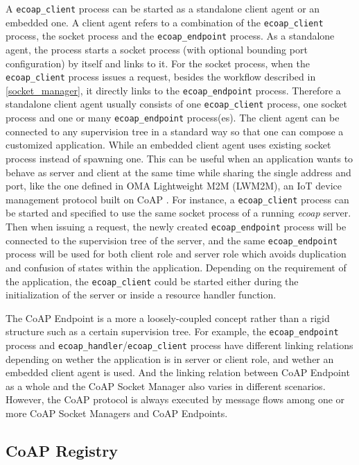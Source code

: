 \begin{itemize}
A \verb|ecoap_client| process can be started as a standalone client agent or an embedded one. A client agent refers to a combination of the \verb|ecoap_client| process, the socket process and the \verb|ecoap_endpoint| process. As a standalone agent, the process starts a socket process (with optional bounding port configuration) by itself and links to it. For the socket process, when the \verb|ecoap_client| process issues a request, besides the workflow described in \ref{socket_manager}, it directly links to the \verb|ecoap_endpoint| process. Therefore a standalone client agent usually consists of one \verb|ecoap_client| process, one socket process and one or many \verb|ecoap_endpoint| process(es). The client agent can be connected to any supervision tree in a standard way so that one can compose a customized application. While an embedded client agent uses existing socket process instead of spawning one. This can be useful when an application wants to behave as server and client at the same time while sharing the single address and port, like the one defined in OMA Lightweight M2M (LWM2M), an IoT device management protocol built on CoAP \cite{}. For instance, a \verb|ecoap_client| process can be started and specified to use the same socket process of a running \textit{ecoap} server. Then when issuing a request, the newly created \verb|ecoap_endpoint| process will be connected to the supervision tree of the server, and the same \verb|ecoap_endpoint| process will be used for both client role and server role which avoids duplication and confusion of states within the application. Depending on the requirement of the application, the \verb|ecoap_client| could be started either during the initialization of the server or inside a resource handler function.

\end{itemize}

The CoAP Endpoint is a more a loosely-coupled concept rather than a rigid structure such as a certain supervision tree. For example, the \verb|ecoap_endpoint| process and \verb|ecoap_handler|/\verb|ecoap_client| process have different linking relations depending on wether the application is in server or client role, and wether an embedded client agent is used. And the linking relation between CoAP Endpoint as a whole and the CoAP Socket Manager also varies in different scenarios. However, the CoAP protocol is always executed by message flows among one or more CoAP Socket Managers and CoAP Endpoints.

\subsection{CoAP Registry}

